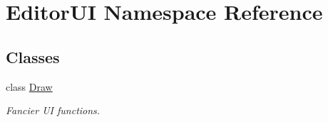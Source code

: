 \hypertarget{namespace_editor_u_i}{}\section{Editor\+UI Namespace Reference}
\label{namespace_editor_u_i}
\subsection*{Classes}
\begin{DoxyCompactItemize}
\item 
class \hyperlink{class_editor_u_i_1_1_draw}{Draw}
\begin{DoxyCompactList}\small\item\em Fancier UI functions. \end{DoxyCompactList}\end{DoxyCompactItemize}
